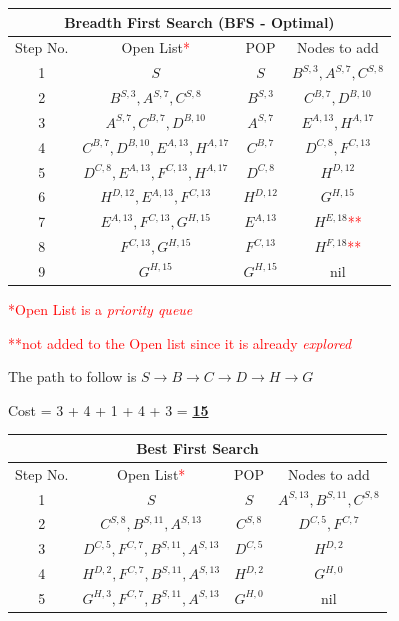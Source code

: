\documentclass[12pt, letterpaper]{article}
\begin{document}
\begin{center}
    \begin{tabular}{|c|c|c|c|}
    \hline
    \multicolumn{4}{|c|}{Breadth First Search (\textbf{BFS} - Optimal)}\\
    \hline
    Step No. & Open List\textcolor{red}{*} & POP & Nodes to add \\ 
    \hline
    1 & $S$ & $S$ & $B^{S,3}, A^{S,7}, C^{S,8}$\\
    \hline
    2 & $B^{S,3}, A^{S,7}, C^{S,8}$ & $B^{S,3}$ & $C^{B,7},D^{B,10}$ \\
    \hline
    3 & $A^{S,7}, C^{B,7}, D^{B,10}$ & $A^{S,7}$ & $E^{A,13}, H^{A,17}$ \\
    \hline
    4 & $C^{B,7}, D^{B,10}, E^{A,13}, H^{A,17}$ & $C^{B,7}$ & $D^{C,8}, F^{C,13}$\\
    \hline
    5 & $D^{C,8}, E^{A,13}, F^{C,13}, H^{A,17}$ & $D^{C,8}$ & $H^{D,12}$\\
    \hline
    6 & $H^{D,12}, E^{A,13}, F^{C,13}$ & $H^{D,12}$ & $G^{H,15}$\\
    \hline
    7 & $E^{A,13}, F^{C,13}, G^{H,15}$ & $E^{A,13}$ & $H^{E,18}$\textcolor{red}{**}\\
    \hline
    8 & $F^{C,13}, G^{H,15}$ & $F^{C,13}$ & $H^{F,18}$\textcolor{red}{**}\\
    \hline
    9 & $G^{H,15}$ & $G^{H,15}$ & nil\\
    \hline
    \end{tabular}
\end{center}

\textcolor{red}{*Open List is a \textit{priority queue}}

\textcolor{red}{**not added to the Open list since it is already \textit{explored}}

The path to follow is $S\rightarrow B\rightarrow C\rightarrow D\rightarrow H\rightarrow G$

Cost = 3 + 4 + 1 + 4 + 3 = \underline{\textbf{15}}

\begin{center}
    \begin{tabular}{|c|c|c|c|}
    \hline
    \multicolumn{4}{|c|}{Best First Search}\\
    \hline
    Step No. & Open List\textcolor{red}{*} & POP & Nodes to add \\ 
    \hline
    1 & $S$ & $S$ & $A^{S,13}, B^{S,11}, C^{S,8}$ \\
    \hline
    2 & $C^{S,8}, B^{S,11}, A^{S,13}$ & $C^{S,8}$ & $D^{C,5}, F^{C,7}$ \\
    \hline
    3 & $D^{C,5}, F^{C,7}, B^{S,11}, A^{S,13}$ & $D^{C,5}$ & $H^{D,2}$ \\
    \hline
    4 & $H^{D,2}, F^{C,7}, B^{S,11}, A^{S,13}$ & $H^{D,2}$ & $G^{H,0}$\\
    \hline
    5 & $G^{H,3}, F^{C,7}, B^{S,11}, A^{S,13}$ & $G^{H,0}$ & nil\\
    \hline
    \end{tabular}
\end{center}
\end{document}
